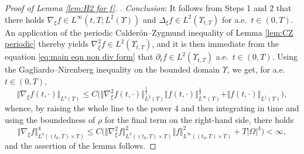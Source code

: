 \documentclass[11pt,a4paper,reqno]{amsart}
\theoremstyle{remark}
\theoremstyle{definition}
\numberwithin{equation}{section}
\newcommand{\bxi}{\xi}
\begin{document}
\begin{proof}[Proof of Lemma \ref{lem:H2 for f}]
 
    \smallskip 

    . \textit{Conclusion}: It follows from Steps 1 and 2 that there holds $\nabla_{\bxi} f \in L^\infty(t,T;L^2(\Upsilon))$ and $\Delta_{\bxi} f \in L^2(\Upsilon_{t,T})$ for a.e.~$t \in (0,T)$. An application of the periodic Calder\'on--Zygmund inequality of Lemma \ref{lem:CZ periodic} thereby yields $\nabla^2_{\bxi} f \in L^2(\Upsilon_{t,T})$, and it is then immediate from the equation \eqref{eq:main eqn non div form} that $\partial_t f \in L^2(\Upsilon_{t,T})$ a.e.~$t\in (0,T)$. Using the Gagliardo--Nirenberg inequality on the bounded domain $\Upsilon$, we get, for a.e.~$t \in (0,T)$, 
\begin{equation*}
    \Vert \nabla_{\bxi} f(t,\cdot) \Vert_{L^4(\Upsilon)} \leq C \Big( \Vert \nabla_{\bxi}^2 f(t,\cdot) \Vert_{L^2(\Upsilon)}^{\frac{1}{2}} \Vert f(t,\cdot) \Vert_{L^\infty(\Upsilon)}^{\frac{1}{2}} + \Vert f(t,\cdot) \Vert_{L^1(\Upsilon)} \Big), 
\end{equation*}
whence, by raising the whole line to the power $4$ and then integrating in time and using the boundedness of $\rho$ for the final term on the right-hand side, there holds 
\begin{equation}\label{eq:L4 grad f using GN}
    \Vert \nabla_{\bxi} f \Vert_{L^4((t_0,T)\times\Upsilon)}^4 \leq C \Big( \Vert \nabla_{\bxi}^2 f \Vert_{L^2((t_0,T)\times\Upsilon)}^{2} \Vert f \Vert_{L^\infty((t_0,T)\times\Upsilon)}^{2} + T|\Omega|^4 \Big)  < \infty, 
\end{equation}
and the assertion of the lemma follows. 
\end{proof}
\end{document}
